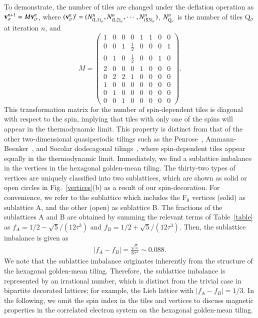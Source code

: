 \documentclass[aps,twocolumn,pra,superscriptaddress,amsmath,amssymb]{revtex4-1}
\begin{document}
To demonstrate, the number of tiles are changed under the deflation operation as
${\bf v}^{n+1}_\sigma=M {\bf v}^n_\sigma$,
where $({\bf v}^n_\sigma)^t=(N^n_{{\rm (L1)}_\sigma},N^n_{{\rm (L2)}_\sigma},\cdots,N^n_{{\rm (S3)}_\sigma})$,
$N^n_{{\rm Q}_\sigma}$ is the number of tiles Q$_\sigma$ at iteration $n$, and
\begin{equation}
M=\left(
\begin{array}{cccccccc}
1 & 0 & 0 & 0 & 1 & 1 & 0 & 0\\
0 & 0 & 1 & \frac{1}{2}&0 & 0 & 0 & 1\\
0 & 1 & 0 & \frac{1}{2}&0 & 0 & 1 & 0\\
2 & 0 & 0 & 0 & 1 & 0 & 0 & 0\\
0 & 2 & 2 & 1 & 0 & 0 & 0 & 0\\
1 & 0 & 0 & 0 & 0 & 0 & 0 & 0\\
0 & 1 & 0 & 0 & 0 & 0 & 0 & 0\\
0 & 0 & 1 & 0 & 0 & 0 & 0 & 0
\end{array}
\right).
\end{equation}
This transformation matrix for the number of spin-dependent tiles
is diagonal with respect to the spin, implying that tiles with only one of the spins will appear in the thermodynamic limit.
This property is distinct from that of the other two-dimensional quasiperiodic tilings
such as the Penrose~\cite{Koga_Tsunetsugu},
Ammann-Beenker~\cite{Koga_AB}, and Socolar dodecagonal tilings~\cite{Koga_dodeca},
where spin-dependent tiles appear equally in the thermodynamic limit.
Immediately, we find a sublattice imbalance in the vertices in the hexagonal golden-mean tiling.
The thirty-two types of vertices are uniquely classified into
two sublattices, which are shown as solid or open circles in Fig.~\ref{vertices}(b) as a result of our spin-decoration. For convenience, we refer to the sublattice which includes the F$_0$ vertices (solid) as sublattice A, and the other (open) as sublattice B.
The fractions of the sublattices A and B are obtained by summing the relevant terms of Table~\ref{table} as
$f_A=1/2-\sqrt{5}/(12\tau^3)$ and $f_B=1/2+\sqrt{5}/(12\tau^3)$.
Then, the sublattice imbalance is given
as
\begin{eqnarray}
  \big|f_A-f_B\big|=\frac{\sqrt{5}}{6\tau^{3}}\sim 0.088.\label{sub}
\end{eqnarray}
We note that the sublattice imbalance originates
inherently from the structure of the hexagonal golden-mean tiling.
Therefore, the sublattice imbalance is represented by an irrational number, which is distinct from the trivial case in bipartite decorated lattices;
for example, the Lieb lattice with $\big|f_A-f_B\big|=1/3$.
In the following, we omit the spin index in the tiles and vertices
to discuss magnetic properties 
in the correlated electron system on the hexagonal golden-mean tiling.
\end{document}
